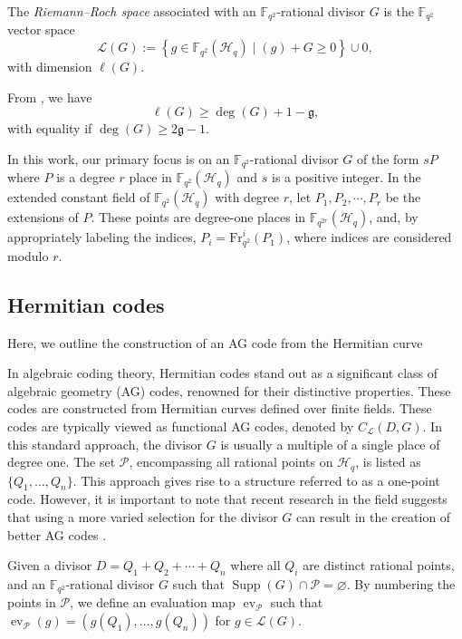 \documentclass[a4paper]{amsart}
\theoremstyle{plain}
\theoremstyle{definition}
\theoremstyle{remark}
\DeclareMathOperator{\ev}{ev}
\newcommand{\calP}{\mathcal{P}}
\newcommand{\calL}{\mathcal{L}}
\newcommand{\set}[1]{\left\{#1\right\}}
\newcommand{\Supp}{\operatorname{Supp}}
\begin{document}
The \emph{Riemann--Roch space} associated with an  $\mathbb{F}_{q^2}$-rational divisor $G$ is the $\mathbb{F}_{q^2}$ vector space \[\mathscr{L}(G) := \set{g \in \mathbb{F}_{q^2}(\mathscr{H}_q) \mid (g) + G \geq 0} \cup {0},\] with dimension $\ell(G)$.


From  \cite[Riemann's Theorem~1.4.17]{stichtenoth2009algebraic}, we have \[\ell(G) \geq \deg(G) +1 - \mathfrak{g},\] with equality if $\deg(G) \geq 2\mathfrak{g}-1$.


In this work, our primary focus is on an $\mathbb{F}_{q^2}$-rational divisor $G$ of the form $ sP$ where $P$ is a degree $r$ place in $\mathbb{F}_{q^2}(\mathscr{H}_q)$ and $s$ is a positive integer. In the extended constant field of $\mathbb{F}_{q^2}(\mathscr{H}_q)$ with degree $r$, let $P_1, P_2, \cdots, P_r$ be the extensions of $P$. These points are degree-one places in $\mathbb{F}_{q^{2r}}(\mathscr{H}_q)$, and, by appropriately labeling the indices, $P_{i} = \text{Fr}^i_{q^2}(P_1)$, where indices are considered modulo $r$.




\subsection*{Hermitian codes}
Here, we outline the construction of an AG code from the Hermitian curve


In algebraic coding theory, Hermitian codes stand out as a significant class of algebraic geometry (AG) codes, renowned for their distinctive properties. These codes are constructed from Hermitian curves defined over finite fields. These codes are typically viewed as functional AG codes, denoted by $C_{\mathcal{L}}(D, G)$. In this standard approach, the divisor $G$ is usually a multiple of a single place of degree one. The set $\mathcal{P}$, encompassing all rational points on $\mathscr{H}_q$, is listed as $\{Q_1, \ldots, Q_{n}\}$. This approach gives rise to a structure referred to as a one-point code. However, it is important to note that recent research in the field suggests that using a more varied selection for the divisor $G$ can result in the creation of better AG codes \cite{matthews2005one,korchmaros2013hermitian}.



Given a divisor $D=Q_1+Q_2+\cdots+Q_n$ where all $Q_i$ are distinct rational points, and an $\mathbb{F}_{q^2}$-rational divisor $G$ such that $\Supp(G) \cap \calP = \varnothing$. By numbering the points in $\calP$, we define an evaluation map $\ev_{\calP}$ such that $\ev_{\calP}(g) = (g(Q_1),\dots,g(Q_n))$ for $g \in \calL(G)$. 
\end{document}
